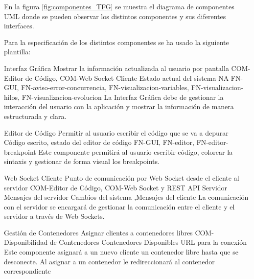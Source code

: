 En la figura \ref{fig:componentes_TFG} se muestra el diagrama de componentes UML \cite{Cook2017} donde se pueden observar los distintos componentes y sus diferentes interfaces.


Para la especificación de los distintos componentes se ha usado la siguiente plantilla: 

\printcomptemplate
\begin{component}{Interfaz Gráfica}
{Mostrar la información actualizada al usuario por pantalla}
{COM-Editor de Código, COM-Web Socket Cliente} %
{Estado actual del sistema} %
{NA} %
{FN-GUI, FN-aviso-error-concurrencia, FN-visualizacion-variables, FN-visualizacion-hilos, FN-visualizacion-evolucion} %
La Interfaz Gráfica debe de gestionar la interacción del usuario con la aplicación y mostrar la información de manera estructurada y clara. %
\end{component}

\begin{component}{Editor de Código}
    {Permitir al usuario escribir el código que se va a depurar}
    {\NA} %
    {\NA} %
    {Código escrito, estado del editor de código} %
    {FN-GUI, FN-editor, FN-editor-breakpoint} %
    Este componente permitirá al usuario escribir código, colorear la sintaxis y gestionar de forma visual los breakpoints. %
\end{component}

\begin{component}{Web Socket Cliente}
{Punto de comunicación por Web Socket desde el cliente al servidor}
{COM-Editor de Código, COM-Web Socket y REST API Servidor} %
{Mensajes del servidor} %
{Cambios del sistema ,Mensajes del cliente} %
{} %
La comunicación con el servidor se encargará de gestionar la comunicación entre el cliente y el servidor a través de Web Sockets. %
\end{component}


\begin{component}{Gestión de Contenedores}
{Asignar clientes a contenedores libres}
{COM-Disponibilidad de Contenedores} %
{Contenedores Disponibles} %
{URL para la conexión} %
{\NA} %
Este componente asignará a un nuevo cliente un contenedor libre hasta que se desconecte. Al asignar a un contenedor le redireccionará al contenedor correspondiente %
\end{component}

